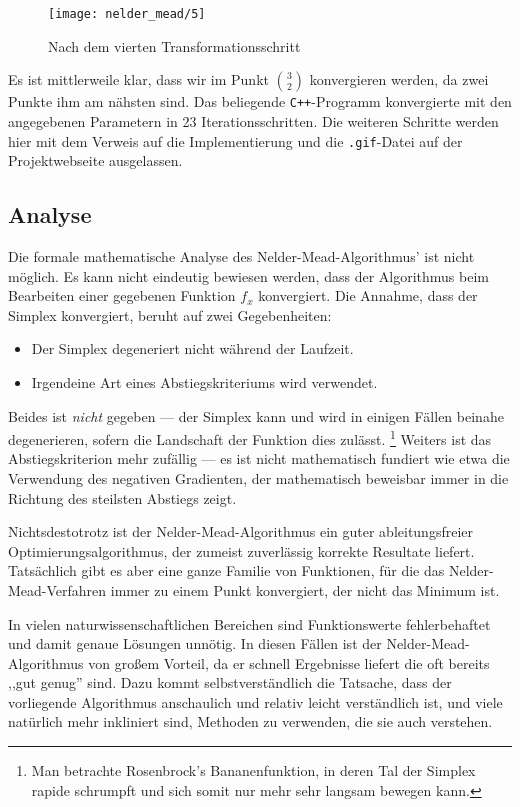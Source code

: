 \documentclass[naustrian]{article}
\begin{document}
{\begin{figure}[h]
    \centering
    \texttt{[image: nelder\_mead/5]}
    \caption{Nach dem vierten Transformationsschritt}
    \label{fourth-transformation}
\end{figure}

Es ist mittlerweile klar, dass wir im Punkt $\binom{3}{2}$ konvergieren werden,
da zwei Punkte ihm am nähsten sind.  Das beliegende {\tt C++}-Programm
konvergierte mit den angegebenen Parametern in 23 Iterationsschritten. Die
weiteren Schritte werden hier mit dem Verweis auf die Implementierung und die
{\tt .gif}-Datei auf der Projektwebseite ausgelassen.

\subsection{Analyse}

Die formale mathematische Analyse des Nelder-Mead-Algorithmus' ist nicht möglich.
Es kann nicht eindeutig bewiesen werden, dass der Algorithmus beim Bearbeiten einer gegebenen
Funktion $f_x$ konvergiert. Die Annahme, dass der Simplex konvergiert, beruht auf zwei
Gegebenheiten:

\begin{itemize}
\item Der Simplex degeneriert nicht während der Laufzeit.
\item Irgendeine Art eines Abstiegskriteriums wird verwendet.
\end{itemize}

Beides ist \emph{nicht} gegeben --- der Simplex kann und wird in einigen Fällen
beinahe degenerieren, sofern die Landschaft der Funktion dies
zulässt.
\footnote{Man betrachte Rosenbrock's Bananenfunktion, in deren Tal der Simplex rapide schrumpft und sich somit nur mehr sehr langsam bewegen kann.}
Weiters ist das Abstiegskriterion mehr zufällig --- es ist nicht mathematisch
fundiert wie etwa die Verwendung des negativen Gradienten, der mathematisch beweisbar
immer in die Richtung des steilsten Abstiegs zeigt. ~\cite{nelder-mead-scholarpedia}

Nichtsdestotrotz ist der Nelder-Mead-Algorithmus ein guter ableitungsfreier
Optimierungsalgorithmus, der zumeist zuverlässig korrekte Resultate liefert.
Tatsächlich gibt es aber eine ganze Familie von Funktionen, für die das Nelder-Mead-Verfahren
immer zu einem Punkt konvergiert, der nicht das Minimum ist.~\cite{nelder-mead-convergence}

In vielen naturwissenschaftlichen Bereichen sind Funktionswerte fehlerbehaftet und damit
genaue Lösungen unnötig. In diesen Fällen ist der Nelder-Mead-Algorithmus von großem
Vorteil, da er schnell Ergebnisse liefert die oft bereits ,,gut genug'' sind.
Dazu kommt selbstverständlich die Tatsache, dass der vorliegende Algorithmus anschaulich
und relativ leicht verständlich ist, und viele natürlich mehr inkliniert sind, Methoden
zu verwenden, die sie auch verstehen.

}
\end{document}

